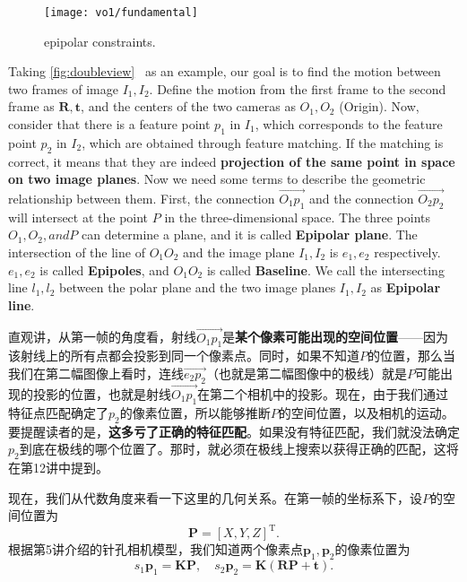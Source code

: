 \begin{figure}[!htp]
	\centering
	\texttt{[image: vo1/fundamental]}
	\caption{epipolar constraints.}
	\label{fig:doubleview}
\end{figure}

Taking \autoref{fig:doubleview}~ as an example, our goal is to find the motion between two frames of image $I_{1}, I_{2}$. Define the motion from the first frame to the second frame as $\bm{R}, \bm{t}$, and the centers of the two cameras as $O_{1}, O_{2}$ (Origin). Now, consider that there is a feature point $p_{1}$ in $I_{1}$, which corresponds to the feature point $p_{2}$ in $I_{2}$, which are obtained through feature matching. If the matching is correct, it means that they are indeed \textbf{projection of the same point in space on two image planes}. Now we need some terms to describe the geometric relationship between them. First, the connection $\overrightarrow{O_{1}p_{1}}$ and the connection $\overrightarrow{O_{2}p_{2}}$ will intersect at the point $P$ in the three-dimensional space. The three points $O_{1}, O_{2}, and P$ can determine a plane, and it is called \textbf{Epipolar plane}. The intersection of the line of $O_{1}O_{2}$ and the image plane $I_{1}, I_{2}$ is $e_{1}, e_{2}$ respectively. $e_{1}, e_{2}$ is called \textbf{Epipoles}, and $O_{1}O_{2}$ is called \textbf{Baseline}. We call the intersecting line $l_{1},l_{2}$ between the polar plane and the two image planes $I_{1}, I_{2}$ as \textbf{Epipolar line}.

直观讲，从第一帧的角度看，射线$\overrightarrow{O_1 p_1}$是\textbf{某个像素可能出现的空间位置}——因为该射线上的所有点都会投影到同一个像素点。同时，如果不知道$P$的位置，那么当我们在第二幅图像上看时，连线$\overrightarrow{e_2 p_2}$（也就是第二幅图像中的极线）就是$P$可能出现的投影的位置，也就是射线$\overrightarrow{O_1 p_1}$在第二个相机中的投影。现在，由于我们通过特征点匹配确定了$p_2$的像素位置，所以能够推断$P$的空间位置，以及相机的运动。要提醒读者的是，\textbf{这多亏了正确的特征匹配}。如果没有特征匹配，我们就没法确定$p_2$到底在极线的哪个位置了。那时，就必须在极线上搜索以获得正确的匹配，这将在第12讲中提到。

现在，我们从代数角度来看一下这里的几何关系。在第一帧的坐标系下，设$P$的空间位置为
\[
\bm{P}=[X,Y,Z]^\mathrm{T}.
\]
根据第5讲介绍的针孔相机模型，我们知道两个像素点$\bm{p}_1,\bm{p}_2$的像素位置为
\begin{equation}
s_1 {\bm{p}_1} = \bm{KP},\quad s_2 \bm{p}_2 = \bm{K}\left( \bm{RP + t} \right).
\end{equation}

